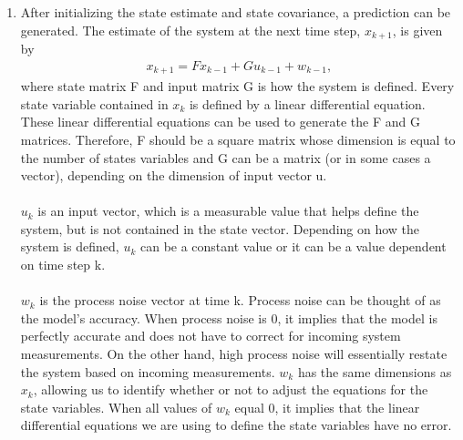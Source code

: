 \begin{enumerate}
   
  \item After initializing the state estimate and state covariance, a prediction can be generated. The estimate of the system at the next time step, $x_{k+1}$,  is given by
  \begin{align*}
      x_{k+1} = F x_{k-1} +  G u_{k-1} + w_{k-1} ,
  \end{align*} 
  where state matrix F and input matrix G is how the system is defined. Every state variable contained in $x_k$ is defined by a linear differential equation. These linear differential equations can be used to generate the F and G matrices. Therefore, F should be a square matrix whose dimension is equal to the number of states variables and G can be a matrix (or in some cases a vector), depending on the dimension of input vector u. \\ \\
  $u_k$  is an input vector, which is a measurable value that helps define the system, but is not contained in the state vector. Depending on how the system is defined, $u_k$  can be a constant value or it can be a value dependent on time step k. \\ \\
  $w_k$ is the process noise vector at time k. Process noise can be thought of as the model's accuracy. When process noise is 0, it implies that the model is perfectly accurate and does not have to correct for incoming system measurements. On the other hand, high process noise will essentially restate the system based on incoming measurements. $w_k$ has the same dimensions as $x_k$, allowing us to identify whether or not to adjust the equations for the state variables. When all values of  $w_k$ equal 0, it implies that the linear differential equations we are using to define the state variables have no error. 
  
  
  

\end{enumerate}
